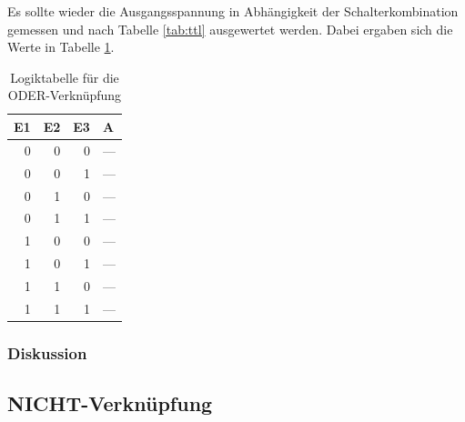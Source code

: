\documentclass[12pt,a4paper]{article}
\begin{document}
Es sollte wieder die Ausgangsspannung in Abhängigkeit der Schalterkombination gemessen und nach Tabelle \ref{tab:ttl} ausgewertet werden. Dabei ergaben sich die Werte in Tabelle \ref{tab:1_2}.

\begin{table}[H]
\begin{center}
\begin{tabular}{r|r|r|l}

\multicolumn{1}{l|}{E1} & \multicolumn{1}{l|}{E2} & \multicolumn{1}{l|}{E3} & A \\ \hline \hline
0 & 0 & 0 & --- \\ 
0 & 0 & 1 & --- \\ 
0 & 1 & 0 & --- \\ 
0 & 1 & 1 & --- \\ 
1 & 0 & 0 & --- \\ 
1 & 0 & 1 & --- \\ 
1 & 1 & 0 & --- \\ 
1 & 1 & 1 & --- \\ 
\end{tabular}
\end{center}
\caption{Logiktabelle für die ODER-Verknüpfung}
\label{tab:1_2}
\end{table}


\subsubsection*{Diskussion}




\subsection{NICHT-Verknüpfung}
\end{document}
